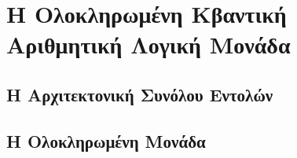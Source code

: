 \chapter{Η Ολοκληρωμένη Κβαντική Αριθμητική Λογική Μονάδα}

\section{Η Αρχιτεκτονική Συνόλου Εντολών}
\section{Η Ολοκληρωμένη Μονάδα}